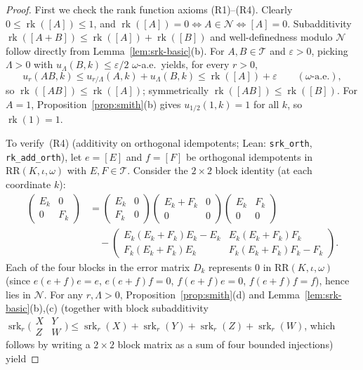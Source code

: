 \documentclass[11pt]{article}
\theoremstyle{definition}
\theoremstyle{remark}
\numberwithin{equation}{section}
\DeclareMathOperator{\rk}{rk}
\DeclareMathOperator{\srk}{srk}
\newcommand{\RR}{\mathrm{RR}}
\newcommand{\TT}{\mathcal{T}}
\newcommand{\NN}{\mathcal{N}}
\newcommand{\1}{\mathbf{1}}
\newcommand{\code}[1]{{\normalfont\small\texttt{#1}}}
\begin{document}
\begin{proof}
First we check the rank function axioms (R1)--(R4). Clearly $0 \le \rk([A]) \le 1$, and $\rk([A]) = 0 \iff A \in \NN \iff [A] = 0$. Subadditivity $\rk([A+B]) \le \rk([A]) + \rk([B])$ and well-definedness modulo $\NN$ follow directly from Lemma~\ref{lem:srk-basic}(b). For $A, B \in \TT$ and $\varepsilon > 0$, picking $\Lambda > 0$ with $u_\Lambda(B, k) \le \varepsilon/2$ $\omega$-a.e.\ yields, for every $r > 0$,
\[
u_r(AB, k) \le u_{r/\Lambda}(A, k) + u_\Lambda(B, k) \le \rk([A]) + \varepsilon \qquad (\omega\text{-a.e.}),
\]
so $\rk([AB]) \le \rk([A])$; symmetrically $\rk([AB]) \le \rk([B])$. For $A = 1$, Proposition~\ref{prop:smith}(b) gives $u_{1/2}(1, k) = 1$ for all $k$, so $\rk(1) = 1$.

To verify~(R4) (additivity on orthogonal idempotents; Lean: \code{srk\_orth}, \code{rk\_add\_orth}), let $e = [E]$ and $f = [F]$ be orthogonal idempotents in $\RR(K, \iota, \omega)$ with $E, F \in \TT$. Consider the $2 \times 2$ block identity (at each coordinate $k$):
\begin{align*}
\begin{pmatrix} E_k & 0 \\ 0 & F_k \end{pmatrix}
&= \begin{pmatrix} E_k & 0 \\ F_k & 0 \end{pmatrix}
\begin{pmatrix} E_k + F_k & 0 \\ 0 & 0 \end{pmatrix}
\begin{pmatrix} E_k & F_k \\ 0 & 0 \end{pmatrix} \\
&\quad - \begin{pmatrix}
E_k(E_k+F_k)E_k - E_k & E_k(E_k+F_k)F_k \\
F_k(E_k+F_k)E_k & F_k(E_k+F_k)F_k - F_k
\end{pmatrix}.
\end{align*}
Each of the four blocks in the error matrix $D_k$ represents $0$ in $\RR(K, \iota, \omega)$ (since $e(e+f)e = e$, $e(e+f)f = 0$, $f(e+f)e = 0$, $f(e+f)f = f$), hence lies in $\NN$. For any $r, \Lambda > 0$, Proposition~\ref{prop:smith}(d) and Lemma~\ref{lem:srk-basic}(b),(c) (together with block subadditivity $\srk_r\bigl(\begin{smallmatrix} X & Y \\ Z & W \end{smallmatrix}\bigr) \le \srk_r(X) + \srk_r(Y) + \srk_r(Z) + \srk_r(W)$, which follows by writing a $2 \times 2$ block matrix as a sum of four bounded injections) yield

\end{proof}
\end{document}
